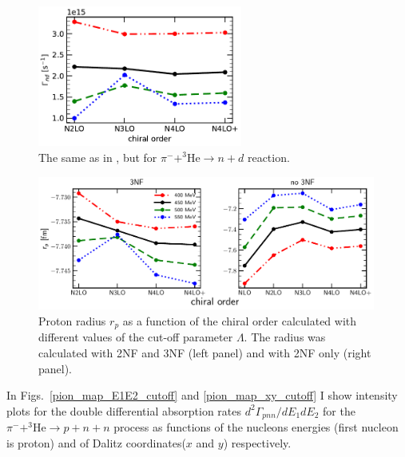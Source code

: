     \begin{figure}[h]
        \begin{center}
        \includegraphics[width=0.6\textwidth]{PlotData/PION/Dalitz_maps/figures/Gamma_nd.pdf}
        \end{center}
        \caption{The same as in , but for $\pi^- + ^3\text{He} \rightarrow n + d$ reaction.}
        \label{Gamma_nd}
    \end{figure}

    \begin{figure}[h]
        \begin{center}
        \includegraphics[width=0.99\textwidth]{PlotData/PION/Dalitz_maps/figures/proton_radius_mt31_3NF.pdf}
        \end{center}
        \caption{ Proton radius $r_p$ as a function of the chiral order calculated with
        different values of the cut-off parameter $\Lambda$. The radius was calculated with 2NF and 3NF (left panel)
        and with 2NF only (right panel).}
        \label{proton_rad}
    \end{figure}

    In Figs.~\ref{pion_map_E1E2_cutoff} and \ref{pion_map_xy_cutoff} I show 
    intensity plots for the double differential absorption rates
    $d^2 \Gamma_{pnn}/dE_1dE_2$ for the $\pi^- + ^3\text{He} \rightarrow p + n + n$
    process as functions of the nucleons energies (first nucleon is proton) and 
    of  Dalitz coordinates($x$ and $y$) respectively.

